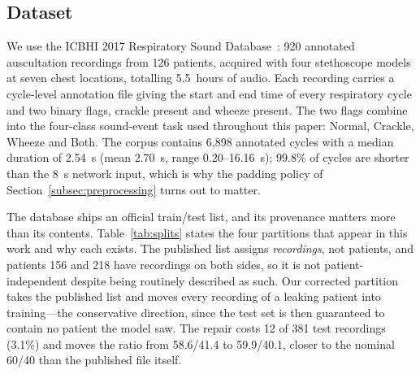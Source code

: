 \documentclass[journal,onecolumn]{IEEEtran}
\begin{document}
\subsection{Dataset}
\label{subsec:dataset}

We use the ICBHI 2017 Respiratory Sound Database~\cite{rocha2019icbhi}: 920
annotated auscultation recordings from 126 patients, acquired with four
stethoscope models at seven chest locations, totalling 5.5~hours of audio. Each
recording carries a cycle-level annotation file giving the start and end time of
every respiratory cycle and two binary flags, crackle present and wheeze present.
The two flags combine into the four-class sound-event task used throughout this
paper: Normal, Crackle, Wheeze and Both. The corpus contains 6{,}898 annotated
cycles with a median duration of 2.54~s (mean 2.70~s, range 0.20--16.16~s);
99.8\% of cycles are shorter than the 8~s network input, which is why the padding
policy of Section~\ref{subsec:preprocessing} turns out to matter.

The database ships an official train/test list, and its provenance matters more
than its contents. Table~\ref{tab:splits} states the four partitions that appear in
this work and why each exists. The published list assigns \emph{recordings}, not
patients, and patients 156 and 218 have recordings on both sides, so it is not
patient-independent despite being routinely described as such. Our corrected
partition takes the published list and moves every recording of a leaking patient
into training---the conservative direction, since the test set is then guaranteed
to contain no patient the model saw. The repair costs 12 of 381 test recordings
(3.1\%) and moves the ratio from 58.6/41.4 to 59.9/40.1, closer to the nominal
60/40 than the published file itself.
\end{document}
